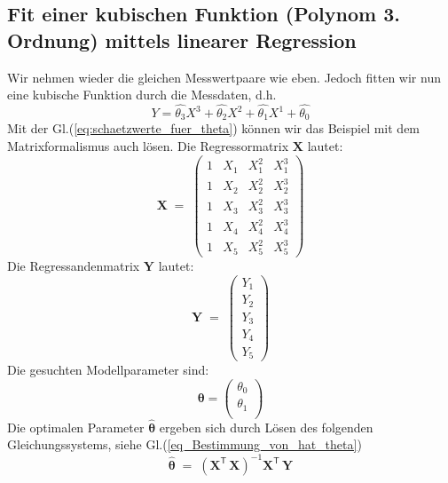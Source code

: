 \subsection{Fit einer kubischen Funktion (Polynom 3. Ordnung) mittels linearer Regression}
Wir nehmen wieder die gleichen Messwertpaare wie eben. Jedoch fitten wir 
nun eine kubische Funktion durch die Messdaten, d.h. 
\begin{equation}
Y = \hat{\theta_3} X^3 + \hat{\theta_2} X^2 + \hat{\theta_1} X^1 +
\hat{\theta_0} 
\end{equation}
Mit der Gl.(\ref{eq:schaetzwerte_fuer_theta}) können wir 
das Beispiel mit dem Matrixformalismus auch lösen. 
Die Regressormatrix $\boldsymbol X$ lautet:
\begin{equation}
	\boldsymbol{X} \; = \;
	\left(
	\begin{array}{cccc}
		1 & X_1 & X_1^2 & X_1^3 \\
		1 & X_2 & X_2^2 & X_2^3 \\
		1 & X_3 & X_3^2 & X_3^3\\
		1 & X_4 & X_4^2 & X_4^3\\
		1 & X_5 & X_5^2 & X_5^3
	\end{array}
	\right)
\end{equation}
Die Regressandenmatrix $\boldsymbol Y$ lautet:
\begin{equation}
	\boldsymbol{Y} \; = \;
	\left(
	\begin{array}{cc}
		Y_1 \\
		Y_2 \\
		Y_3 \\
		Y_4 \\
		Y_5 
	\end{array}
	\right)
\end{equation}
Die gesuchten Modellparameter sind: 
\[
\boldsymbol\theta = \left( 
\begin{array}{cc}
	\theta_0 \\
	\theta_1 \\
\end{array}
\right)
\]
Die optimalen Parameter $\boldsymbol{\hat \theta}$ ergeben sich durch Lösen
des folgenden Gleichungssystems, siehe Gl.(\ref{eq_Bestimmung_von_hat_theta})
\[
\boldsymbol{\hat \theta} \; = \;
\left( \mathbf{X}^\mathsf{T}  \, \mathbf{X} \right)^{-1} \mathbf{X}^\mathsf{T} \, \mathbf{Y}
\]

